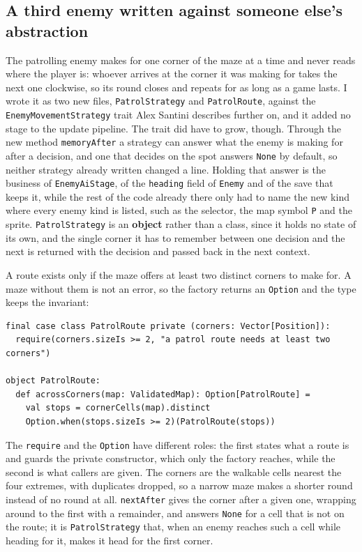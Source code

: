 \subsection{A third enemy written against someone else's abstraction}

The patrolling enemy makes for one corner of the maze at a time and never reads where the player is: whoever arrives
at the corner it was making for takes the next one clockwise, so its round closes and repeats for as long as a game
lasts. I wrote it as
two new files, \texttt{PatrolStrategy} and \texttt{PatrolRoute}, against the \texttt{EnemyMovementStrategy} trait
Alex Santini describes further on, and it added no stage to the update pipeline. The trait did have to grow, though. Through the new method
\texttt{memoryAfter} a strategy can answer what the enemy is making for after a decision, and one that decides on the
spot answers \texttt{None} by default, so neither strategy already written changed a line. Holding that answer is the
business of \texttt{EnemyAiStage}, of the \texttt{heading} field of \texttt{Enemy} and of the save that keeps it, while the rest of the code already there only had to name the new kind where every enemy kind is listed, such as
the selector, the map symbol \texttt{P} and the sprite. \texttt{PatrolStrategy} is an \textbf{object} rather than a class, since it holds
no state of its own, and the single corner it has to remember between one decision and the next is returned with the decision and passed back in the next context.

A route exists only if the maze offers at least two distinct corners to make for. A maze without them is not an error, so the factory returns an \texttt{Option} and the type keeps the invariant:

\begin{lstlisting}
final case class PatrolRoute private (corners: Vector[Position]):
  require(corners.sizeIs >= 2, "a patrol route needs at least two corners")

object PatrolRoute:
  def acrossCorners(map: ValidatedMap): Option[PatrolRoute] =
    val stops = cornerCells(map).distinct
    Option.when(stops.sizeIs >= 2)(PatrolRoute(stops))
\end{lstlisting}

The \texttt{require} and the \texttt{Option} have different roles: the first
states what a route is and guards the private constructor, which only the factory reaches, while the second is what callers are given. The corners are the
walkable cells nearest the four extremes, with duplicates dropped, so a narrow maze makes a shorter round instead of
no round at all. \texttt{nextAfter} gives the corner after a given one, wrapping around to the first with a
remainder, and answers \texttt{None} for a cell that is not on the route; it is \texttt{PatrolStrategy} that, when an enemy reaches such a cell while heading for it, makes it head for the
first corner.


